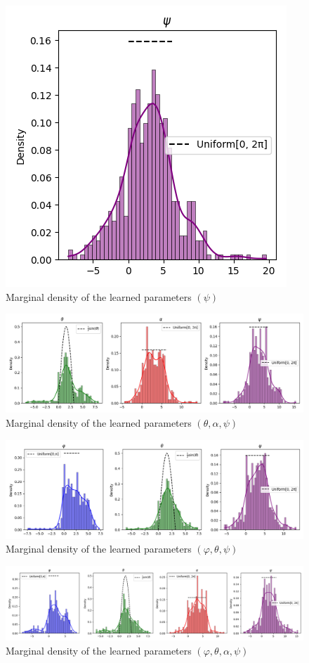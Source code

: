 \documentclass[a4paper,12pt]{article}
\theoremstyle{definition}
\begin{document}
\begin{figure}[H]
    \centering
    \includegraphics[height=0.35\textwidth]{VariableSelectionPsi/psi.png}
    \caption{Marginal density of the learned parameters \((\psi)\)}
    \label{fig:Distributions5.5}
\end{figure}
\begin{figure}[H]
    \centering
    \includegraphics[height=0.35\textwidth]{VariableSelectionPsi/theta_alpha_psi.png}
    \caption{Marginal density of the learned parameters \((\theta,\alpha,\psi)\)}
    \label{fig:Distributions5.6}
\end{figure}
\begin{figure}[H]
    \centering
    \includegraphics[height=0.35\textwidth]{VariableSelectionPsi/phi_theta_psi.png}
    \caption{Marginal density of the learned parameters \((\varphi,\theta,\psi)\)}
    \label{fig:Distributions5.7}
\end{figure}
\begin{figure}[H]
    \centering
    \includegraphics[width=\textwidth]{VariableSelectionPsi/phi_theta_alpha_psi.png}
    \caption{Marginal density of the learned parameters \((\varphi,\theta,\alpha,\psi)\)}
    \label{fig:Distributions5.8}
\end{figure}
\end{document}
